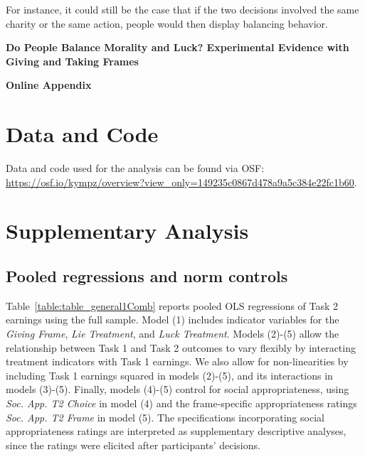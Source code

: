 \documentclass{article}
\begin{document}
For instance, it could still be the case that if the two decisions involved the same charity or the same action, people would then display balancing behavior. 


\printbibliography

\newpage

\appendix

\begin{center}
    {\Large \textbf{Do People Balance Morality and Luck? Experimental Evidence with Giving and Taking Frames}}
    \par \vspace{5mm}
    {\Large \textbf{Online Appendix}}
\end{center}

\startcontents[sections]


\section{Data and Code}
Data and code used for the analysis can be found via OSF: \url{https://osf.io/kympz/overview?view_only=149235c0867d478a9a5c384e22fc1b60}.

\section{Supplementary Analysis}

\subsection{Pooled regressions and norm controls}

Table~\ref{table:table_general1Comb} reports pooled OLS regressions of Task 2 earnings using the full sample. Model (1) includes indicator variables for the \textit{Giving Frame}, \textit{Lie Treatment}, and \textit{Luck Treatment}. Models (2)-(5) allow the relationship between Task 1 and Task 2 outcomes to vary flexibly by interacting treatment indicators with Task 1 earnings. We also allow for non-linearities by including Task 1 earnings squared in models (2)-(5), and its interactions in models (3)-(5). Finally, models (4)-(5) control for social appropriateness, using \textit{Soc. App. T2 Choice} in model (4) and the frame-specific appropriateness ratings \textit{Soc. App. T2 Frame} in model (5). The specifications incorporating social appropriateness ratings are interpreted as supplementary descriptive analyses, since the ratings were elicited after participants' decisions.
\end{document}
